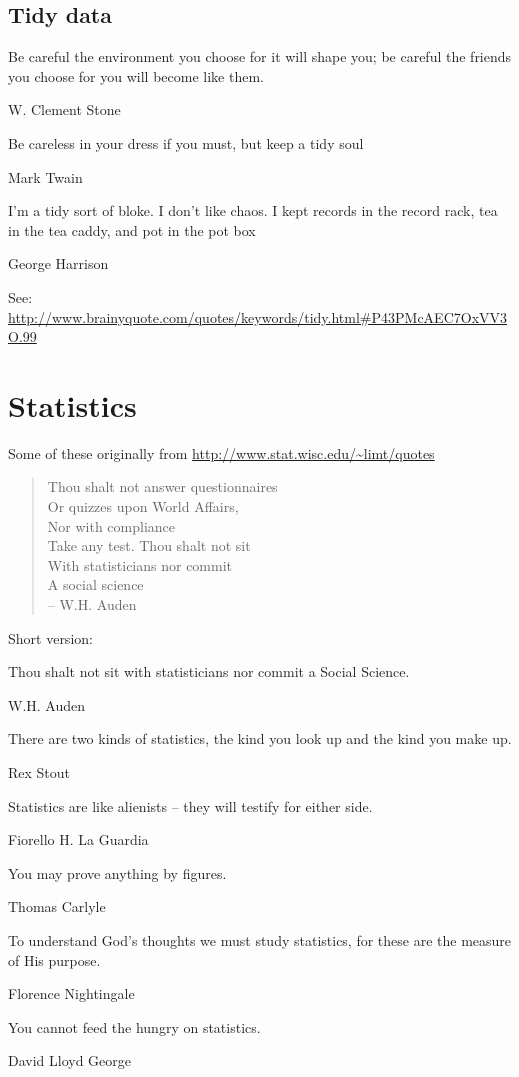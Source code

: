 \subsection{Tidy data}
\epigraph{Be careful the environment you choose for it will shape you; be careful the friends you choose for you will become like them.}{W. Clement Stone}

\epigraph{Be careless in your dress if you must, but keep a tidy soul}{Mark Twain}

\epigraph{I'm a tidy sort of bloke. I don't like chaos. I kept records in the record rack, tea in the tea caddy, and pot in the pot box}{George Harrison}

See: \url{http://www.brainyquote.com/quotes/keywords/tidy.html#P43PMcAEC7OxVV3O.99}

\section{Statistics}

Some of these originally from \url{http://www.stat.wisc.edu/~limt/quotes}

\begin{verse}
Thou shalt not answer questionnaires\\
Or quizzes upon World Affairs,\\
Nor with compliance\\
Take any test. Thou shalt not sit\\
With statisticians nor commit\\
A social science\\
-- W.H. Auden
\end{verse}

Short version:
\epigraph{Thou shalt not sit with statisticians nor commit a Social Science.}{W.H. Auden}


\epigraph{There are two kinds of statistics, the kind you look up and the kind you make up.}{Rex Stout}

\epigraph{Statistics are like alienists -- they will testify for either side.}{Fiorello H. La Guardia}

\epigraph{You may prove anything by figures.}{Thomas Carlyle}


\epigraph{To understand God's thoughts we must study statistics, for these are the measure of His purpose.}{Florence Nightingale}

\epigraph{You cannot feed the hungry on statistics.}{David Lloyd George}


